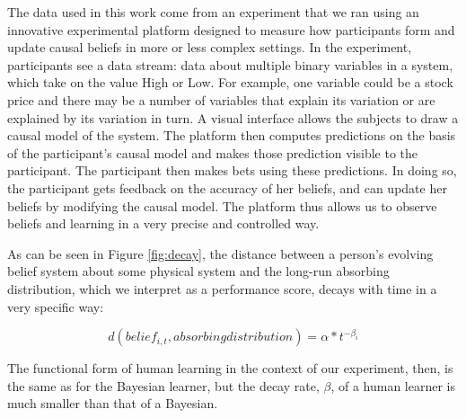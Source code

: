 The data used in this work come from an experiment that we ran using an innovative experimental platform designed to measure how participants form and update causal beliefs in more or less complex settings.  In the experiment, participants see a data stream: data about multiple binary variables in a system, which take on the value High or Low. For example, one variable could be a stock price and there may be a number of variables that explain its variation or are explained by its variation in turn.  A visual interface allows the subjects to draw a causal model of the system. The platform then computes predictions on the basis of the participant's causal model and makes those prediction visible to the participant. The participant then makes bets using these predictions. In doing so, the participant gets feedback on the accuracy of her beliefs, and can update her beliefs by modifying the causal model. The platform thus allows us to observe beliefs and learning in a very precise and controlled way.

As can be seen in Figure \ref{fig:decay}, the distance between a person's evolving belief system about some physical system and the long-run absorbing distribution, which we interpret as a performance score, decays with time in a very specific way:

\begin{equation}
\label{ }
d(belief_{i, t}, absorbing distribution) = \alpha*t^{-\beta_i}
\end{equation}



The functional form of human learning in the context of our experiment, then, is the same as for the Bayesian learner, but the decay rate, $\beta$, of a human learner is much smaller than that of a Bayesian. 


